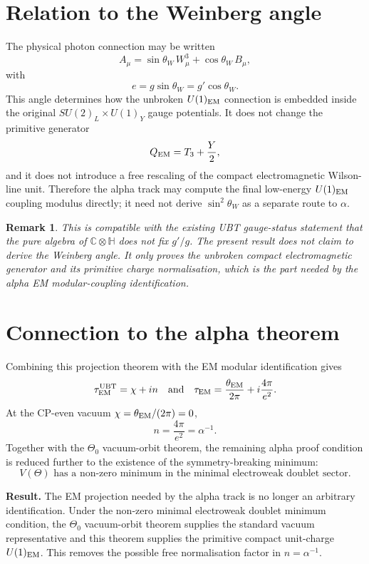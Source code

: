 \documentclass[12pt,a4paper]{article}
\newtheorem{remark}[definition]{Remark}
\begin{document}
\section{Relation to the Weinberg angle}

The physical photon connection may be written
\[
  A_\mu=\sin\theta_W\,W^3_\mu+\cos\theta_W\,B_\mu,
\]
with
\[
  e=g\sin\theta_W=g'\cos\theta_W.
\]
This angle determines how the unbroken \(U(1)_{\rm EM}\) connection is embedded
inside the original \(SU(2)_L\times U(1)_Y\) gauge potentials.  It does not
change the primitive generator
\[
  Q_{\rm EM}=T_3+\frac{Y}{2},
\]
and it does not introduce a free rescaling of the compact electromagnetic
Wilson-line unit.  Therefore the alpha track may compute the final low-energy
\(U(1)_{\rm EM}\) coupling modulus directly; it need not derive
\(\sin^2\theta_W\) as a separate route to \(\alpha\).

\begin{remark}
This is compatible with the existing UBT gauge-status statement that the pure
algebra of \(\mathbb C\otimes\mathbb H\) does not fix \(g'/g\).  The present
result does not claim to derive the Weinberg angle.  It only proves the
unbroken compact electromagnetic generator and its primitive charge
normalisation, which is the part needed by the alpha EM modular-coupling
identification.
\end{remark}

\section{Connection to the alpha theorem}

Combining this projection theorem with the EM modular identification gives
\[
  \tau^{\rm UBT}_{\rm EM}=\chi+i n
  \quad\text{and}\quad
  \tau_{\rm EM}=\frac{\theta_{\rm EM}}{2\pi}+i\frac{4\pi}{e^2}.
\]
At the CP-even vacuum \(\chi=\theta_{\rm EM}/(2\pi)=0\),
\[
  n=\frac{4\pi}{e^2}=\alpha^{-1}.
\]
Together with the \(\Theta_0\) vacuum-orbit theorem, the remaining alpha proof
condition is reduced further to the existence of the symmetry-breaking minimum:
\[
  \boxed{
    V(\Theta)\text{ has a non-zero minimum in the minimal electroweak doublet sector.}
  }
\]

\begin{resultbox}
\textbf{Result.} The EM projection needed by the alpha track is no longer an
arbitrary identification.  Under the non-zero minimal electroweak doublet
minimum condition, the \(\Theta_0\) vacuum-orbit theorem supplies the standard
vacuum representative and this theorem supplies the primitive compact
unit-charge \(U(1)_{\rm EM}\).  This removes the possible free normalisation
factor in \(n=\alpha^{-1}\).
\end{resultbox}

\ifdefined\INCLUDEMODE\else
\end{document}

